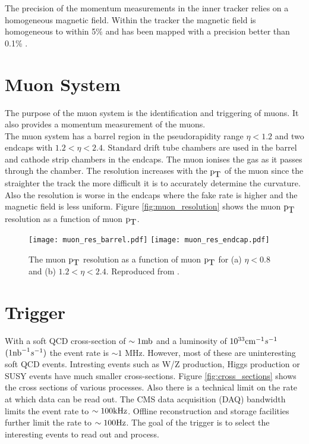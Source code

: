 The precision of the momentum measurements in the inner tracker relies on a
homogeneous magnetic field. Within the tracker the magnetic field is homogeneous
to within 5\% \cite{field_measurement} and has been mapped with a precision 
better than 0.1\% \cite{field_uniformity}.

\section{Muon System}

The purpose of the muon system is the identification and triggering of muons. It
also provides a momentum measurement of the muons. \\

The muon system has a barrel region in the pseudorapidity range $\eta < 1.2$ and
two endcaps with $1.2 < \eta < 2.4$. Standard drift tube chambers are used in
the barrel and cathode strip chambers in the endcaps. The muon ionises the gas 
as it passes through the chamber. The resolution increases with the $\mbox{p}_{\mbox{T}}$ of the
muon since the straighter the track the more difficult it is to accurately 
determine the curvature. Also the resolution is worse in the endcaps where the
fake rate is higher and the magnetic field is less uniform. Figure
\ref{fig:muon_resolution} shows the muon $\mbox{p}_{\mbox{T}}$ resolution as a function of muon
$\mbox{p}_{\mbox{T}}$.

\begin{figure}
\texttt{[image: muon\_res\_barrel.pdf]}
\texttt{[image: muon\_res\_endcap.pdf]}
\caption{The muon $\mbox{p}_{\mbox{T}}$ resolution as a function of muon $\mbox{p}_{\mbox{T}}$ for (a) $\eta <
0.8$ and (b) $1.2 < \eta < 2.4$. Reproduced from \cite{muon_resolution}.}
\label{fig:muon_resolurion}
\end{figure}

\section{Trigger}

With a soft QCD cross-section of $\sim1\mbox{mb}$ and a luminosity of
$10^{33}\mbox{cm}^{-1}s^{-1}$ $(1\mbox{nb}^{-1} s^{-1})$ the event rate is $\sim 1$ MHz. 
However, most of these are uninteresting soft QCD events. Intresting events such
as W/Z production, Higgs production or SUSY events have much smaller 
cross-sections. Figure \ref{fig:cross_sections} shows the cross sections of
various processes. Also there is a technical limit on the rate at which data can
be read out. The CMS data acquisition (DAQ) bandwidth limits the event rate to 
$\sim 100\mbox{kHz}$. Offline reconstruction and storage facilities further limit the
rate to $\sim 100\mbox{Hz}$. The goal of the trigger is to select the interesting 
events to read out and process. \\

